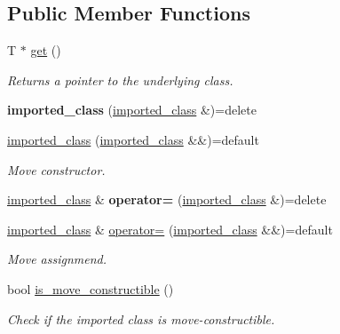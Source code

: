 \subsection*{Public Member Functions}
\begin{DoxyCompactItemize}
\item 
\mbox{\label{a01664_a6605491bba4a2f25af7d7dbb86855524}} 
T $\ast$ \hyperlink{a01664_a6605491bba4a2f25af7d7dbb86855524}{get} ()
\begin{DoxyCompactList}\small\item\em Returns a pointer to the underlying class. \end{DoxyCompactList}\item 
\mbox{\label{a01664_adf0748e828a8fc810b721b017735dbbb}} 
{\bfseries imported\+\_\+class} (\hyperlink{a01664}{imported\+\_\+class} \&)=delete
\item 
\mbox{\label{a01664_abdd658355cf8bdd782138525420a794c}} 
\hyperlink{a01664_abdd658355cf8bdd782138525420a794c}{imported\+\_\+class} (\hyperlink{a01664}{imported\+\_\+class} \&\&)=default
\begin{DoxyCompactList}\small\item\em Move constructor. \end{DoxyCompactList}\item 
\mbox{\label{a01664_a100fea6a169061c64a84d584c81f947f}} 
\hyperlink{a01664}{imported\+\_\+class} \& {\bfseries operator=} (\hyperlink{a01664}{imported\+\_\+class} \&)=delete
\item 
\mbox{\label{a01664_a0a3936704be3249f7bce69e24e230626}} 
\hyperlink{a01664}{imported\+\_\+class} \& \hyperlink{a01664_a0a3936704be3249f7bce69e24e230626}{operator=} (\hyperlink{a01664}{imported\+\_\+class} \&\&)=default
\begin{DoxyCompactList}\small\item\em Move assignmend. \end{DoxyCompactList}\item 
\mbox{\label{a01664_a8609448b6dc64a623863793d6dedde75}} 
bool \hyperlink{a01664_a8609448b6dc64a623863793d6dedde75}{is\+\_\+move\+\_\+constructible} ()
\begin{DoxyCompactList}\small\item\em Check if the imported class is move-\/constructible. \end{DoxyCompactList}\item 

\end{DoxyCompactItemize}
